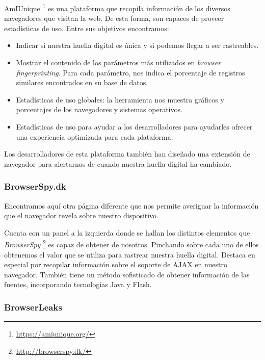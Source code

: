 AmIUnique \footnote{\url{https://amiunique.org/}} es una plataforma que recopila información de los diversos navegadores que visitan la web. De esta forma, son capaces de proveer estadísticas de uso. Entre sus objetivos encontramos: \par 
\begin{itemize}
	\item Indicar si nuestra huella digital es única y si podemos llegar a ser rastreables.
	\item Mostrar el contenido de los parámetros más utilizados en \textit{browser fingerprinting}. Para cada parámetro, nos indica el porcentaje de registros similares encontrados en su base de datos.
	\item Estadísticas de uso globales: la herramienta nos muestra gráficos y porcentajes de los navegadores y sistemas operativos.
	\item Estadísticas de uso para ayudar a los desarrolladores para ayudarles ofrecer una experiencia optimizada para cada plataforma.
\end{itemize}

Los desarrolladores de esta plataforma también han diseñado una extensión de navegador para alertarnos de cuando nuestra huella digital ha cambiado. \par 

\subsubsection{BrowserSpy.dk}

Encontramos aquí otra página diferente que nos permite averiguar la información que el navegador revela sobre nuestro dispositivo. \par 

Cuenta con un panel a la izquierda donde se hallan los distintos elementos que \textit{BrowserSpy} \footnote{\url{http://browserspy.dk/}} es capaz de obtener de nosotros. Pinchando sobre cada uno de ellos obtenemos el valor que se utiliza para rastrear nuestra huella digital. Destaca en especial por recopilar información sobre el soporte de AJAX en nuestro navegador. También tiene un método sofisticado de obtener información de las fuentes, incorporando tecnologías Java y Flash. \par 

\subsubsection{BrowserLeaks}

